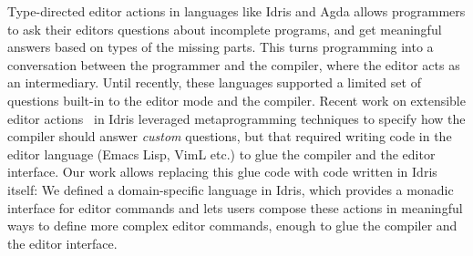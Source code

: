 Type-directed editor actions in languages like Idris and Agda allows programmers to
ask their editors questions about incomplete programs, and get
meaningful answers based on types of the missing parts.
This turns programming into a conversation between the programmer and the
compiler, where the editor acts as an intermediary.
Until recently, these languages supported a limited set of questions built-in
to the editor mode and the compiler.
Recent work on extensible editor actions~\cite{extensible} in Idris leveraged
metaprogramming techniques to specify how the compiler should answer
\emph{custom} questions, but that required writing code in the editor language
(Emacs Lisp, VimL etc.) to glue the compiler and the editor interface. Our work
allows replacing this glue code with code written in Idris itself: We defined a
domain-specific language in Idris, which provides a monadic interface for
editor commands and lets users compose these actions in meaningful ways to
define more complex editor commands, enough to glue the compiler and the editor
interface.
